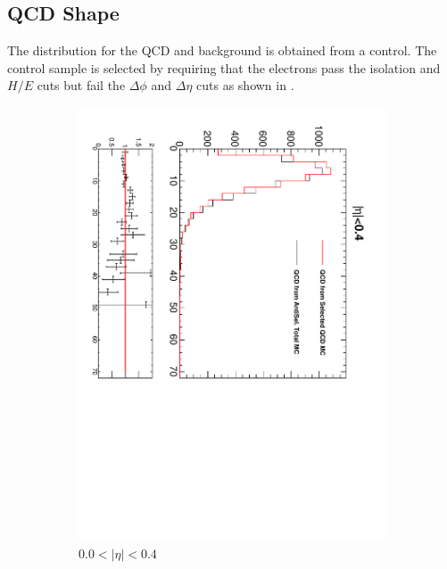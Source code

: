 \subsection{{QCD} \ETm Shape}
The \ETm distribution for the {QCD} and \gjet background is obtained from a control.
The control sample is selected by requiring that the electrons pass the
isolation and $H/E$ cuts but fail the $\Delta\phi$ and $\Delta\eta$ cuts as
shown in .

\begin{figure}[htbp]
  \centering
  \begin{subfigure}{0.4\textwidth}
    \centering
    \includegraphics*[trim = 0mm 0mm 15mm 0mm, clip, width=\textwidth, angle=90]{MetCompare_anti_eta1.pdf}
    \caption{$0.0<| \eta |<0.4$}
    \label{fig:qcd_met_eta1}
  \end{subfigure}
  \begin{subfigure}{0.4\textwidth}

\end{subfigure}
\end{figure}
